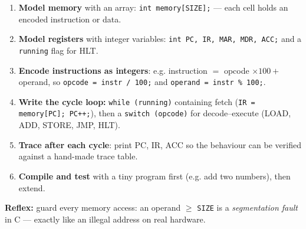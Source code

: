\documentclass[11pt]{article}
\begin{document}
\begin{methode}
\begin{enumerate}
\item \textbf{Model memory} with an array: \texttt{int memory[SIZE];} — each cell holds an encoded instruction or data.
\item \textbf{Model registers} with integer variables: \texttt{int PC, IR, MAR, MDR, ACC;} and a \texttt{running} flag for HLT.
\item \textbf{Encode instructions as integers}: e.g. instruction $=$ opcode $\times 100 +$ operand, so \texttt{opcode = instr / 100;} and \texttt{operand = instr \% 100;}.
\item \textbf{Write the cycle loop:} \texttt{while (running)} containing fetch (\texttt{IR = memory[PC]; PC++;}), then a \texttt{switch (opcode)} for decode–execute (LOAD, ADD, STORE, JMP, HLT).
\item \textbf{Trace after each cycle}: print PC, IR, ACC so the behaviour can be verified against a hand-made trace table.
\item \textbf{Compile and test} with a tiny program first (e.g. add two numbers), then extend.
\end{enumerate}
\textbf{Reflex:} guard every memory access: an operand $\geq$ \texttt{SIZE} is a \emph{segmentation fault} in C — exactly like an illegal address on real hardware.
\end{methode}
\end{document}
